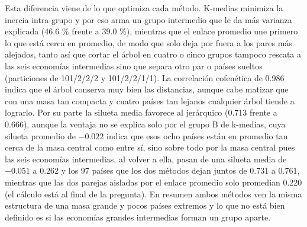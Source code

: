 \documentclass[oneside, openany, fontset=libertinus]{mitthesis}
\newenvironment{Shaded}{\begin{snugshade}}{\end{snugshade}}
\newcommand{\AttributeTok}[1]{\textcolor[rgb]{0.40,0.45,0.13}{#1}}
\newcommand{\ControlFlowTok}[1]{\textcolor[rgb]{0.00,0.23,0.31}{\textbf{#1}}}
\newcommand{\DecValTok}[1]{\textcolor[rgb]{0.68,0.00,0.00}{#1}}
\newcommand{\FunctionTok}[1]{\textcolor[rgb]{0.28,0.35,0.67}{#1}}
\newcommand{\NormalTok}[1]{\textcolor[rgb]{0.00,0.23,0.31}{#1}}
\newcommand{\OtherTok}[1]{\textcolor[rgb]{0.00,0.23,0.31}{#1}}
\newcommand{\SpecialCharTok}[1]{\textcolor[rgb]{0.37,0.37,0.37}{#1}}
\begin{document}
Esta diferencia viene de lo que optimiza cada método. K-medias minimiza
la inercia intra-grupo y por eso arma un grupo intermedio que le da más
varianza explicada (46.6 \% frente a 39.0 \%), mientras que el enlace
promedio une primero lo que está cerca en promedio, de modo que solo
deja por fuera a los pares más alejados, tanto así que cortar el árbol
en cuatro o cinco grupos tampoco rescata a las seis economías
intermedias sino que separa otro par o países sueltos (particiones de
101/2/2/2 y 101/2/2/1/1). La correlación cofenética de 0.986 indica que
el árbol conserva muy bien las distancias, aunque cabe matizar que con
una masa tan compacta y cuatro países tan lejanos cualquier árbol tiende
a lograrlo. Por su parte la silueta media favorece al jerárquico (0.713
frente a 0.666), aunque la ventaja no se explica solo por el grupo B de
k-medias, cuya silueta promedio de \(-0.022\) indica que esos ocho
países están en promedio tan cerca de la masa central como entre sí,
sino sobre todo por la masa central pues las seis economías intermedias,
al volver a ella, pasan de una silueta media de \(-0.051\) a 0.262 y los
97 países que los dos métodos dejan juntos de 0.731 a 0.761, mientras
que las dos parejas aisladas por el enlace promedio solo promedian 0.220
(el cálculo está al final de la pregunta). En resumen ambos métodos ven
la misma estructura de una masa grande y pocos países extremos y lo que
no está bien definido es si las economías grandes intermedias forman un
grupo aparte.

\Needspace{1.52in}

\begin{Shaded}
\end{Shaded}
\end{document}
